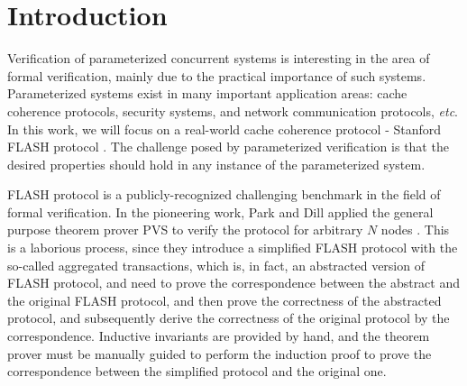 \documentclass{llncs}
\newcommand\JP[1]{\textcolor{magenta}{JP: #1}}
\newcommand{\bedt}[1]{{\color{black}#1}}
\begin{document}
\section{Introduction}\label{sec:introduction}
Verification of parameterized concurrent systems is interesting in
the area of formal \bedt{verification}, mainly due to the practical importance
of such systems. Parameterized systems exist in many important
application areas: cache coherence protocols, security systems, and
network communication protocols, \emph{etc}. In this work, we will
focus on a real-world cache coherence protocol - Stanford FLASH protocol \cite{FLASHCache}. The challenge posed by
parameterized verification is that the desired properties should
hold in any instance of the parameterized system. %

FLASH protocol is a publicly-recognized challenging benchmark in the field of formal
 verification. In the pioneering work,
Park and Dill applied the general purpose theorem prover PVS \cite{cade92-pvs}
to   verify the protocol for arbitrary $N$ nodes \cite{Park1996a}. This is a laborious process, since they introduce a simplified  FLASH protocol with the so-called aggregated transactions, which
is, in fact,  an abstracted version of FLASH protocol, and  need to prove
the correspondence between the abstract and the original FLASH
protocol, and then prove the correctness of the abstracted protocol, and subsequently derive the correctness of  the
original protocol by the correspondence. %
Inductive invariants are provided by \bedt{hand}, and the theorem prover must be manually guided to perform the induction proof to prove the correspondence between the simplified protocol  and the original one. %
\end{document}
